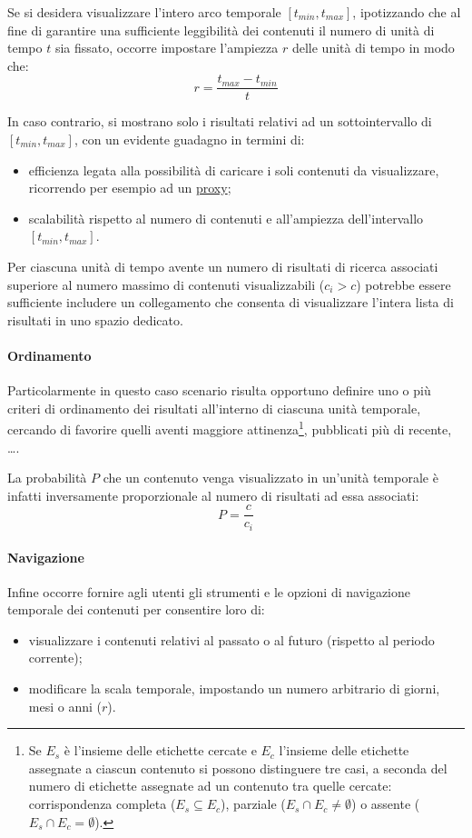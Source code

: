 Se si desidera visualizzare l'intero arco temporale $[t_{min}, t_{max}]$, ipotizzando che al fine di garantire una sufficiente leggibilità dei contenuti il numero di unità di tempo $t$ sia fissato, occorre impostare l'ampiezza $r$ delle unità di tempo in modo che:
\begin{equation}
 r = \frac{t_{max}-t_{min}}{t}
\end{equation}

In caso contrario, si mostrano solo i risultati relativi ad un sottointervallo di $[t_{min}, t_{max}]$, con un evidente guadagno in termini di:
\begin{itemize}
  \item efficienza legata alla possibilità di caricare i soli contenuti da visualizzare, ricorrendo per esempio ad un \underline{proxy};
  \item scalabilità rispetto al numero di contenuti e all'ampiezza dell'intervallo $[t_{min}, t_{max}]$.
\end{itemize}

Per ciascuna unità di tempo avente un numero di risultati di ricerca associati superiore al numero massimo di contenuti visualizzabili ($c_i > c$) potrebbe essere sufficiente includere un collegamento che consenta di visualizzare l'intera lista di risultati in uno spazio dedicato.

\paragraph{Ordinamento}
Particolarmente in questo caso scenario risulta opportuno definire uno o più criteri di ordinamento dei risultati all'interno di ciascuna unità temporale, cercando di favorire quelli aventi maggiore attinenza\footnote{Se $E_s$ è l'insieme delle etichette cercate e $E_c$ l'insieme delle etichette assegnate a ciascun contenuto si possono distinguere tre casi, a seconda del numero di etichette assegnate ad un contenuto tra quelle cercate: corrispondenza completa ($E_s \subseteq E_c$), parziale ($E_s \cap E_c \neq \emptyset$) o assente ($E_s \cap E_c = \emptyset$).}, pubblicati più di recente, \ldots .

La probabilità $P$ che un contenuto venga visualizzato in un'unità temporale è infatti inversamente proporzionale al numero di risultati ad essa associati:
\begin{equation}
P = \frac{c}{c_i}
\end{equation}

\paragraph{Navigazione}
Infine occorre fornire agli utenti gli strumenti e le opzioni di navigazione temporale dei contenuti per consentire loro di:
\begin{itemize}
  \item visualizzare i contenuti relativi al passato o al futuro (rispetto al periodo corrente);
  \item modificare la scala temporale, impostando un numero arbitrario di giorni, mesi o anni ($r$).
\end{itemize}


